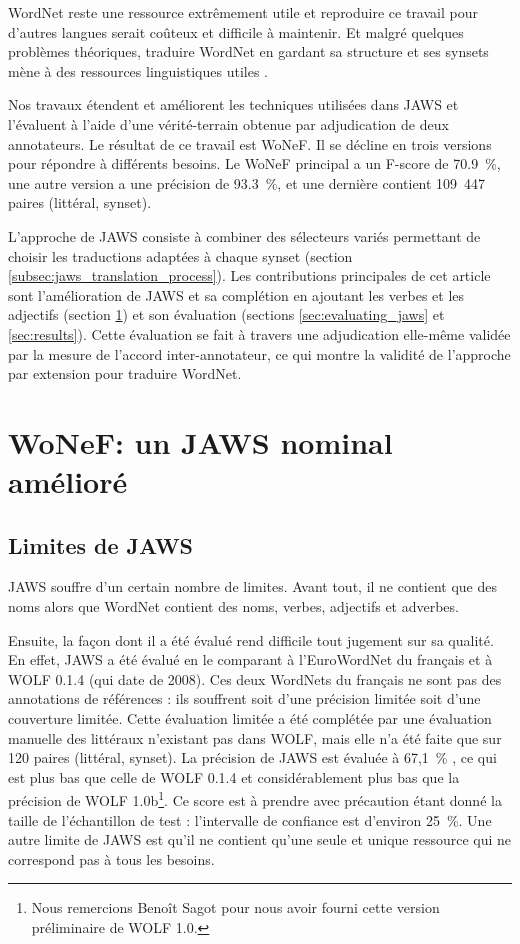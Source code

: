 WordNet reste une ressource extrêmement utile et reproduire ce travail pour
d'autres langues serait coûteux et difficile à maintenir. Et malgré quelques
problèmes théoriques, traduire WordNet en gardant sa structure et ses synsets
mène à des ressources linguistiques utiles
\citep{fellbaum2007connecting,demelo2008utility}.

Nos travaux étendent et améliorent les techniques utilisées dans JAWS et
l'évaluent à l'aide d'une vérité-terrain obtenue par adjudication de deux
annotateurs. Le résultat de ce travail est WoNeF. Il se décline en trois
versions pour répondre à différents besoins. Le WoNeF principal a un F-score de
70.9~\%, une autre version a une précision de 93.3~\%, et une dernière contient
109~447 paires (littéral, synset).

L'approche de JAWS consiste à combiner des sélecteurs variés permettant de
choisir les traductions adaptées à chaque synset (section
\ref{subsec:jaws_translation_process}). Les contributions principales de cet
article sont l'amélioration de JAWS et sa complétion en ajoutant les verbes et
les adjectifs (section \ref{sec:improving_jaws}) et son évaluation (sections
\ref{sec:evaluating_jaws} et \ref{sec:results}). Cette évaluation se fait à
travers une adjudication elle-même validée par la mesure de l'accord
inter-annotateur, ce qui montre la validité de l'approche par extension pour
traduire WordNet.

\section{WoNeF: un JAWS nominal amélioré}
\label{sec:improving_jaws}

\subsection{Limites de JAWS}
\label{subsec:limitations}

JAWS souffre d'un certain nombre de limites. Avant tout, il ne contient que des
noms alors que WordNet contient des noms, verbes, adjectifs et adverbes.

Ensuite, la façon dont il a été évalué rend difficile tout jugement sur sa
qualité. En effet, JAWS a été évalué en le comparant à l'EuroWordNet du
français et à WOLF 0.1.4 (qui date de 2008). Ces deux WordNets du français ne
sont pas des annotations de références : ils souffrent soit d'une précision
limitée soit d'une couverture limitée. Cette évaluation limitée a été complétée
par une évaluation manuelle des littéraux n'existant pas dans WOLF, mais elle
n'a été faite que sur 120 paires (littéral, synset). La précision de JAWS est
évaluée à 67,1~\% \citep{mouton2010phd}, ce qui est plus bas que celle de WOLF
0.1.4 et considérablement plus bas que la précision de WOLF 1.0b\footnote{Nous
remercions Benoît Sagot pour nous avoir fourni cette version préliminaire de
WOLF 1.0.}. Ce score est à prendre avec précaution étant donné la taille de
l'échantillon de test : l'intervalle de confiance est d'environ 25~\%. Une
autre limite de JAWS est qu'il ne contient qu'une seule et unique ressource qui
ne correspond pas à tous les besoins.


